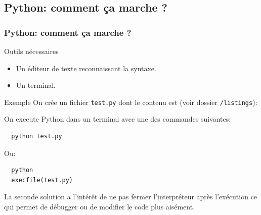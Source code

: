 \documentclass[8pt,a4paper]{beamer}
\begin{document}
  \subsection{Python: comment ça marche ?}
  
  
  
  \begin{frame}[containsverbatim]
  \frametitle{Python: comment ça marche ?}
  \begin{block}{Outils nécessaires}
  \begin{itemize}
  \item Un éditeur de texte reconnaissant la syntaxe.
  \item Un terminal.
  \end{itemize}
  \end{block}
  \begin{block}{Exemple}
  On crée un fichier \lstinline!test.py! dont le contenu est (voir dossier  \lstinline!/listings!):    
  
  On execute Python dans un terminal avec une des commandes suivantes:
  \begin{lstlisting}
  python test.py
  \end{lstlisting}
  Ou:
  \begin{lstlisting}
  python 
  execfile(test.py)
  \end{lstlisting}
  La seconde solution a l'intérêt de ne pas fermer l'interpréteur après l'exécution ce qui permet de débugger ou de modifier le code plus aisément.
  \end{block}
  

  

  \end{frame}
%  
% 
%  
%  
\end{document}
